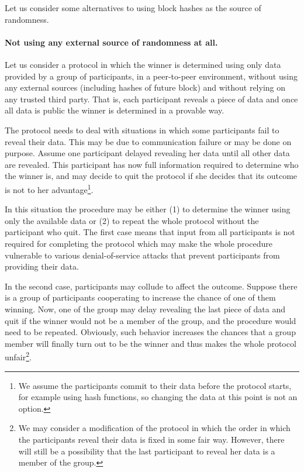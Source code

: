 \documentclass[a4paper]{article}
\begin{document}
    Let us consider some alternatives to using block hashes as the source of randomness.

    \paragraph{Not using any external source of randomness at all.}
    Let us consider a protocol in which the winner is determined using only data provided by a group of participants,
    in a peer-to-peer environment, without using any external sources (including hashes of future block) and without
    relying on any trusted third party. That is, each participant reveals a piece of data and once all data is public
    the winner is determined in a provable way.

    The protocol needs to deal with situations in which some participants fail to reveal their data. This may be due
    to communication failure or may be done on purpose. Assume one participant delayed revealing her data until all
    other data are revealed. This participant has now full information required to determine who the winner is,
    and may decide to quit the protocol if she decides that its outcome is not to her advantage\footnote{We assume
    the participants commit to their data before the protocol starts, for example using hash functions,
    so changing the data at this point is not an option.}.

    In this situation the procedure may be either (1) to determine the winner using only the available data or (2)
    to repeat the whole protocol without the participant who quit. The first case means that input from all
    participants is not required for completing the protocol which may make the whole procedure vulnerable to
    various denial-of-service attacks that prevent participants from providing their data.

    In the second case, participants may collude to affect the outcome. Suppose there is a group of participants
    cooperating to increase the chance of one of them winning. Now, one of the group may delay revealing the last
    piece of data and quit if the winner would not be a member of the group, and the procedure would need to be
    repeated. Obviously, such behavior increases the chances that a group member will finally turn out to be the
    winner and thus makes the whole protocol unfair\footnote{We may consider a modification of the protocol in which
    the order in which the participants reveal their data is fixed in some fair way. However, there will still be
    a possibility that the last participant to reveal her data is a member of the group.}.
\end{document}
